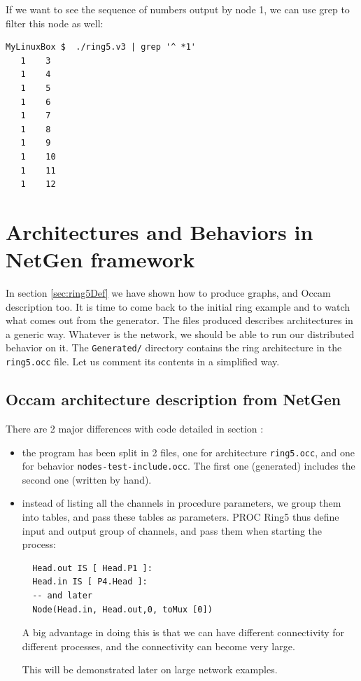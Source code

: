 \documentclass[times]{book}
\begin{document}
If we want to see the sequence of numbers output by node 1,
we can use grep to filter this node as well:

\begin{lstlisting} 
MyLinuxBox $  ./ring5.v3 | grep '^ *1' 
   1    3
   1    4
   1    5
   1    6
   1    7
   1    8
   1    9
   1    10
   1    11
   1    12
\end{lstlisting} 

\section{Architectures and Behaviors in NetGen framework}

In section \ref{sec:ring5Def} we have shown how to produce graphs, and Occam
description too. It is time to come back to the initial ring example and to watch what 
comes out from the generator. The files produced describes architectures in a generic
way. Whatever is the network, we should be able to run our distributed behavior on it.
The {\tt Generated/} directory contains the ring architecture in the {\tt ring5.occ} file.
Let us comment its contents in a simplified way.

\subsection{Occam architecture description from NetGen}

There are 2 major differences with code detailed  in section \label{sec:ringArchiv3}:
\begin{itemize}
\item the program has been split in 2 files, one for architecture {\tt ring5.occ}, and one
for behavior  {\tt nodes-test-include.occ}. The first one (generated) includes the second one
(written by hand).
\item instead of listing all the channels in procedure parameters, we group them into
tables, and pass these tables as parameters. PROC Ring5 thus define input and output
group of channels, and pass them when starting the process:

\begin{lstlisting} 
  Head.out IS [ Head.P1 ]:
  Head.in IS [ P4.Head ]:
  -- and later
  Node(Head.in, Head.out,0, toMux [0])
\end{lstlisting} 

A big advantage in doing this is that we can have different connectivity
for different processes, and the connectivity can become very large.

This will be demonstrated later on large network examples.
\end{itemize}
\end{document}
